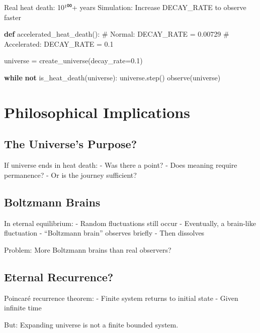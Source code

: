 \documentclass[
  11pt,
  letterpaper,
  twoside,
  openright]{book}
\newenvironment{Shaded}{\begin{snugshade}}{\end{snugshade}}
\newcommand{\CommentTok}[1]{\textcolor[rgb]{0.37,0.37,0.37}{#1}}
\newcommand{\ControlFlowTok}[1]{\textcolor[rgb]{0.00,0.23,0.31}{\textbf{#1}}}
\newcommand{\FloatTok}[1]{\textcolor[rgb]{0.68,0.00,0.00}{#1}}
\newcommand{\KeywordTok}[1]{\textcolor[rgb]{0.00,0.23,0.31}{\textbf{#1}}}
\newcommand{\NormalTok}[1]{\textcolor[rgb]{0.00,0.23,0.31}{#1}}
\newcommand{\OperatorTok}[1]{\textcolor[rgb]{0.37,0.37,0.37}{#1}}
\begin{document}
Real heat death: 10¹⁰⁰+ years Simulation: Increase DECAY\_RATE to
observe faster

\begin{Shaded}
\begin{Highlighting}[]
\KeywordTok{def}\NormalTok{ accelerated\_heat\_death():}
    \CommentTok{\# Normal: DECAY\_RATE = 0.00729}
    \CommentTok{\# Accelerated: DECAY\_RATE = 0.1}

\NormalTok{    universe }\OperatorTok{=}\NormalTok{ create\_universe(decay\_rate}\OperatorTok{=}\FloatTok{0.1}\NormalTok{)}

    \ControlFlowTok{while} \KeywordTok{not}\NormalTok{ is\_heat\_death(universe):}
\NormalTok{        universe.step()}
\NormalTok{        observe(universe)}
\end{Highlighting}
\end{Shaded}

\section{Philosophical Implications}\label{philosophical-implications-1}

\subsection{The Universe's Purpose?}\label{the-universes-purpose}

If universe ends in heat death: - Was there a point? - Does meaning
require permanence? - Or is the journey sufficient?

\subsection{Boltzmann Brains}\label{boltzmann-brains}

In eternal equilibrium: - Random fluctuations still occur - Eventually,
a brain-like fluctuation - ``Boltzmann brain'' observes briefly - Then
dissolves

Problem: More Boltzmann brains than real observers?

\subsection{Eternal Recurrence?}\label{eternal-recurrence}

Poincaré recurrence theorem: - Finite system returns to initial state -
Given infinite time

But: Expanding universe is not a finite bounded system.
\end{document}
